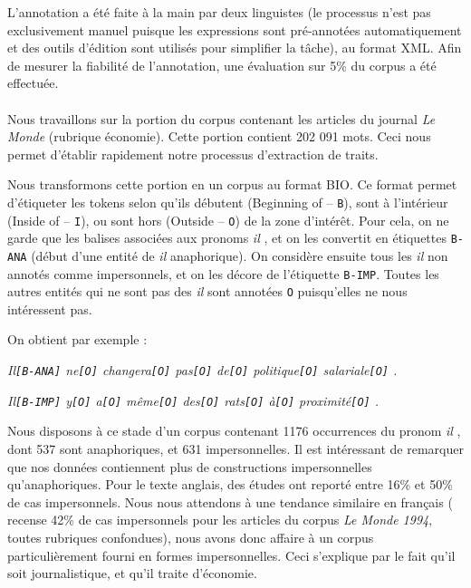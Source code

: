 \documentclass[a4paper,12pt]{article}
\begin{document}
L'annotation a été faite à la main par deux linguistes (le processus n'est pas exclusivement manuel puisque les expressions sont pré-annotées automatiquement et des outils d'édition sont utilisés pour simplifier la tâche), au format XML. Afin de mesurer la fiabilité de l'annotation, une évaluation sur 5\% du corpus a été effectuée.

\paragraph{}
Nous travaillons sur la portion du corpus contenant les articles du journal \emph{Le Monde} (rubrique économie). Cette portion contient 202 091 mots. Ceci nous permet d'établir rapidement notre processus d'extraction de traits.


Nous transformons cette portion en un corpus au format BIO. Ce format permet d'étiqueter les tokens selon qu'ils débutent (Beginning of -- \verb!B!), sont à l'intérieur (Inside of -- \verb!I!), ou sont hors (Outside -- \verb!O!) de la zone d'intérêt.
Pour cela, on ne garde que les balises associées aux pronoms \og \textit{il} \fg{}, et on les convertit en étiquettes \verb!B-ANA! (début d'une entité de \og \textit{il} \fg{} anaphorique). On considère ensuite tous les \og \textit{il} \fg{} non annotés comme impersonnels, et on les décore de l'étiquette \verb!B-IMP!. Toutes les autres entités qui ne sont pas des \og \textit{il} \fg{} sont annotées \verb!O! puisqu'elles ne nous intéressent pas.
\label{annotation-imp}

On obtient par exemple :

\textit{Il\verb![B-ANA]! ne\verb![O]! changera\verb![O]! pas\verb![O]! de\verb![O]! politique\verb![O]! salariale\verb![O]! .}

\textit{Il\verb![B-IMP]! y\verb![O]! a\verb![O]! même\verb![O]! des\verb![O]! rats\verb![O]! à\verb![O]! proximité\verb![O]! .}

Nous disposons à ce stade d'un corpus contenant 1176 occurrences du pronom \og \textit{il} \fg{}, dont 537 sont anaphoriques, et 631 impersonnelles. Il est intéressant de remarquer que nos données contiennent plus de constructions impersonnelles qu'anaphoriques. Pour le texte anglais, des études \citep{gundel} ont reporté entre 16\% et 50\% de cas impersonnels. Nous nous attendons à une tendance similaire en français (\citeauthor{danlos-ilimp-taln2005} recense 42\% de cas impersonnels pour les articles du corpus \textit{Le Monde 1994}, toutes rubriques confondues), nous avons donc affaire à un corpus particulièrement fourni en formes impersonnelles. Ceci s'explique par le fait qu'il soit journalistique, et qu'il traite d'économie.
\end{document}
